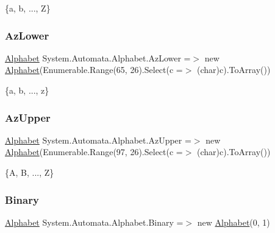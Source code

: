 \{a, b, ..., Z\} 

\mbox{\label{class_system_1_1_automata_1_1_alphabet_a6962b8539b792f5b1c00401f45894b58}} 
\subsubsection{\texorpdfstring{Az\+Lower}{AzLower}}
{\footnotesize\ttfamily \mbox{\hyperlink{class_system_1_1_automata_1_1_alphabet}{Alphabet}} System.\+Automata.\+Alphabet.\+Az\+Lower =$>$ new \mbox{\hyperlink{class_system_1_1_automata_1_1_alphabet}{Alphabet}}(Enumerable.\+Range(65, 26).Select(c =$>$ (char)c).To\+Array())\hspace{0.3cm}{\ttfamily [static]}}



\{a, b, ..., z\} 

\mbox{\label{class_system_1_1_automata_1_1_alphabet_ac1b4eaec3c00e63dab2d176773ec84f1}} 
\subsubsection{\texorpdfstring{Az\+Upper}{AzUpper}}
{\footnotesize\ttfamily \mbox{\hyperlink{class_system_1_1_automata_1_1_alphabet}{Alphabet}} System.\+Automata.\+Alphabet.\+Az\+Upper =$>$ new \mbox{\hyperlink{class_system_1_1_automata_1_1_alphabet}{Alphabet}}(Enumerable.\+Range(97, 26).Select(c =$>$ (char)c).To\+Array())\hspace{0.3cm}{\ttfamily [static]}}



\{A, B, ..., Z\} 

\mbox{\label{class_system_1_1_automata_1_1_alphabet_a33781b08f0b9a39f1da39ee85fd69fb3}} 
\subsubsection{\texorpdfstring{Binary}{Binary}}
{\footnotesize\ttfamily \mbox{\hyperlink{class_system_1_1_automata_1_1_alphabet}{Alphabet}} System.\+Automata.\+Alphabet.\+Binary =$>$ new \mbox{\hyperlink{class_system_1_1_automata_1_1_alphabet}{Alphabet}}(\textquotesingle{}0\textquotesingle{}, \textquotesingle{}1\textquotesingle{})\hspace{0.3cm}{\ttfamily [static]}}




